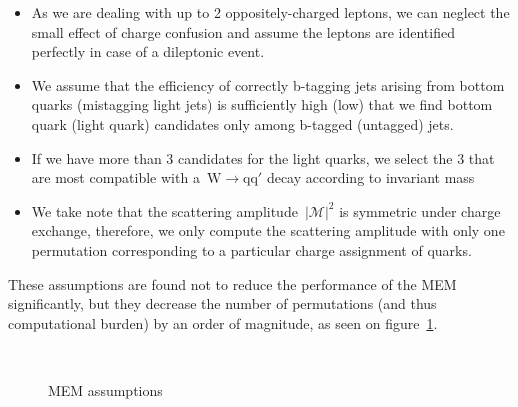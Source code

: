 \begin{itemize}
\item As we are dealing with up to 2 oppositely-charged leptons, we can neglect the small effect of charge confusion and assume the leptons are identified perfectly in case of a dileptonic event.
\item We assume that the efficiency of correctly b-tagging jets arising from bottom quarks (mistagging light jets) is sufficiently high (low) that we find bottom quark (light quark) candidates only among b-tagged (untagged) jets.
\item If we have more than 3 candidates for the light quarks, we select the 3 that are most compatible with a~$\mathrm{W} \rightarrow \mathrm{q}\mathrm{q}'$ decay according to invariant mass
\item We take note that the scattering amplitude~$|\mathcal{M}|^2$ is symmetric under charge exchange, therefore, we only compute the scattering amplitude with only one permutation corresponding to a particular charge assignment of quarks.
\end{itemize}
These assumptions are found not to reduce the performance of the MEM significantly, but they decrease the number of permutations (and thus computational burden) by an order of magnitude, as seen on figure~\cref{fig:mem_assumptions}.

\begin{figure}
\begin{centering}
\\
\caption{\fixme MEM assumptions}
\label{fig:mem_assumptions}
\end{centering}
\end{figure}

